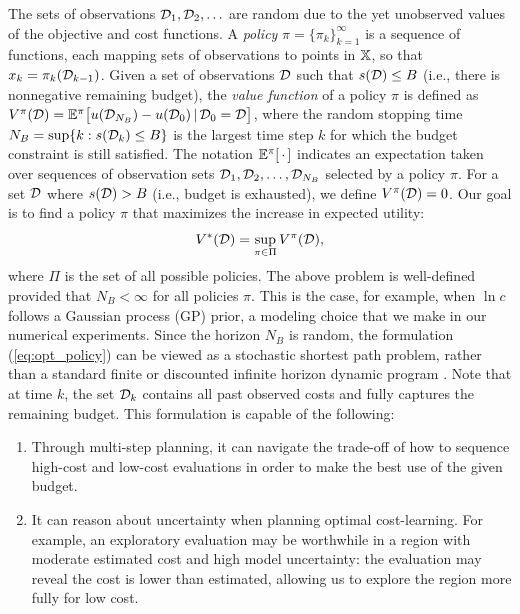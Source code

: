 The sets of observations $\mathcal{D}_1, \mathcal{D}_2, \ldots$ are random due to the yet unobserved values of the objective and cost functions. A \emph{policy} $\pi = \{\pi_k\}_{k=1}^\infty$ is a sequence of functions, each mapping sets of observations to points in $\mathbb{X}$, so that $x_k = \pi_k(\mathcal{D}_{k-1})$. Given a set of observations $\mathcal{D}$ such that $s(\mathcal{D}) \le B$ (i.e., there is nonnegative remaining budget), the \emph{value function} of a policy $\pi$ is defined as $V^\pi(\mathcal{D}) = \mathbb{E}^{\pi}\bigl[u(\mathcal{D}_{N_B}) - u(\mathcal{D}_0) \, | \, \mathcal{D}_0 = \mathcal{D}\bigr]$, where the random stopping time $N_B = \sup\{k : s(\mathcal{D}_k) \leq B\}$ is the largest time step $k$ for which the budget constraint is still satisfied. The notation $\mathbb{E}^\pi[ \, \cdot \, ]$ indicates an expectation taken over sequences of observation sets $\mathcal{D}_1, \mathcal{D}_2, \ldots, \mathcal{D}_{N_B}$ selected by a policy $\pi$. For a set $\mathcal{D}$ where $s(\mathcal{D}) > B$ (i.e., budget is exhausted), we define $V^\pi(\mathcal{D}) = 0$. Our goal is to find a policy $\pi$ that maximizes the increase in expected utility:
\begin{equation}
\label{eq:opt_policy}
   V^*(\mathcal{D}) = \sup_{\pi \in \Pi} V^\pi(\mathcal{D}),
\end{equation}
where $\Pi$ is the set of all possible policies. The above problem is well-defined provided that $N_B < \infty$ for all policies $\pi$. This is the case, for example, when $\ln c$ follows a Gaussian process (GP) prior, a modeling choice that we make in our numerical experiments. Since the horizon $N_B$ is random, the formulation (\ref{eq:opt_policy}) can be viewed as a stochastic shortest path problem, rather than a standard finite or discounted infinite horizon dynamic program \citep{bertsekas1991analysis}. Note that at time $k$, the set $\mathcal{D}_k$ contains all past observed costs and fully captures the remaining budget. 
This formulation is capable of the following:
\begin{enumerate}[itemsep=2pt,topsep=1pt,leftmargin=20pt]
    \item Through multi-step planning, it can navigate the trade-off of how to sequence high-cost and low-cost evaluations in order to make the best use of the given budget.
    \item It can reason about uncertainty when planning optimal cost-learning. For example, an exploratory evaluation may be worthwhile in a region with moderate estimated cost and high model uncertainty: the evaluation may reveal the cost is lower than estimated, allowing us to explore the region more fully for low cost.
\end{enumerate}

